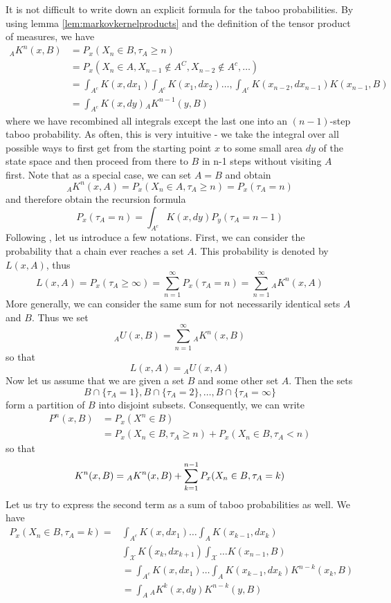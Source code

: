 \documentclass[a4paper, draft]{article}
\theoremstyle{own}
\theoremstyle{remark}
\begin{document}
It is not difficult to write down an explicit formula for the taboo probabilities. By using lemma \ref{lem:markovkernelproducts} and the definition of the tensor product of measures, we have
\begin{align*}
{_A} K^n(x,B) &= P_x(X_n \in B, \tau_A \geq n) \\
&=  P_x(X_n \in A, X_{n-1} \notin A^C, X_{n-2} \notin A^c, \dots) \\
&= \int_{A^c} K(x, dx_1) \int_{A^c} K(x_1, dx_2) \dots, \int_{A^c} K(x_{n-2}, dx_{n-1})
K(x_{n-1}, B) \\
&= \int_{A^c} K(x,dy) {_A}K^{n-1}(y,B)
\end{align*}
where we have recombined all integrals except the last one into an $(n-1)$-step taboo probability. As often, this is very intuitive - we take the integral over all possible ways to first get from the starting point $x$ to some small area $dy$ of the state space and then proceed from there to $B$ in n-1 steps without visiting $A$ first. Note that as a special case, we can set $A = B$ and obtain
$$
{_A}K^n(x,A) = P_x(X_n \in A, \tau_A \geq n) = P_x(\tau_A = n)
$$
and therefore obtain the recursion formula
$$
P_x(\tau_A = n) = \int_{A^c} K(x,dy) P_y(\tau_A = n-1)
$$
Following \cite{MeynTweedie}, let us introduce a few notations. First, we can consider the probability that a chain ever reaches a set $A$. This probability is denoted by $L(x,A)$, thus
$$
L(x,A) = P_x(\tau_A \geq \infty) = \sum_{n=1}^\infty P_x(\tau_A = n) = 
\sum_{n=1}^\infty {_A}K^n(x,A)
$$
More generally, we can consider the same sum for not necessarily identical sets $A$ and $B$. Thus we set
$$
{_A}U(x,B) = \sum_{n=1}^\infty {_A}K^n(x,B)
$$
so that
$$
L(x,A) = {_A}U(x,A)
$$
Now let us assume that we are given a set $B$ and some other set $A$. Then the sets
$$
B \cap \{\tau_A = 1\}, B \cap \{\tau_A = 2\}, \dots, B \cap \{ \tau_A = \infty \}
$$
form a partition of $B$ into disjoint subsets. Consequently, we can write
\begin{align*}
P^n(x,B) &= P_x(X^n \in B) \\
& = P_x(X_n \in B, \tau_A \geq n) + P_x(X_n \in B, \tau_A < n) 
\end{align*}
so that
$$
K^n(x,B) = {_A}K^n(x,B) + \sum_{k=1}^{n-1} P_x(X_n \in B, \tau_A = k) \\
$$
Let us try to express the second term as a sum of taboo probabilities as well. We have
\begin{align*}
P_x(X_n \in B, \tau_A = k) = &\int_{A^c} K(x,dx_1) \dots 
\int_A K(x_{k-1}, dx_k) \\
& \int_{\mathcal X} K(x_k, dx_{k+1}) \int_{\mathcal X}\dots K(x_{n-1}, B) \\
&= \int_{A^c} K(x,dx_1) \dots \int_A K(x_{k-1}, dx_k)   K^{n-k}(x_k, B) \\
&= \int_{A} {_A}K^k(x,dy) K^{n-k}(y, B)
\end{align*}
\end{document}
